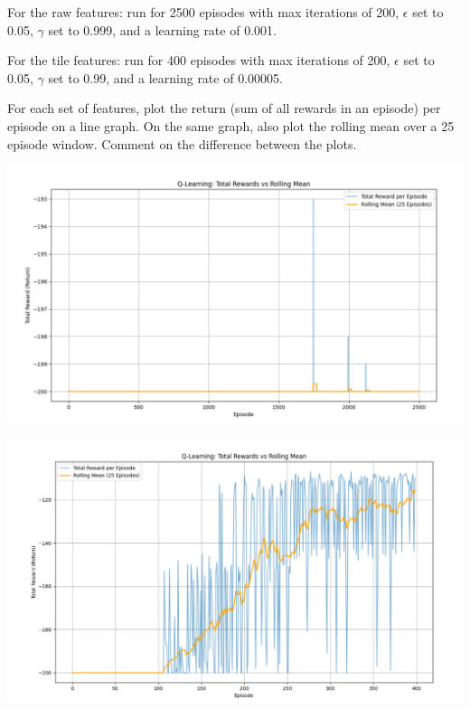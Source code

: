 \documentclass[11pt,addpoints,answers]{exam}
\begin{document}
\begin{questions}
\begin{parts}
    For the raw features: run for 2500 episodes with max iterations of 200, $\epsilon$ set to 0.05, $\gamma$ set to 0.999, and a learning rate of 0.001. 
    
    For the tile features: run for 400 episodes with max iterations of 200, $\epsilon$ set to 0.05, $\gamma$ set to 0.99, and a learning rate of 0.00005.
    
    For each set of features, plot the return (sum of all rewards in an episode) per episode on a line graph. On the same graph, also plot the rolling mean over a 25 episode window. Comment on the difference between the plots.
    
    \begin{your_solution}[title=Plot of Raw, height=10cm]
        \begin{center}
           \includegraphics[width=1\linewidth, height=0.6\columnwidth]{./Q5_1_mc_raw.png}
        \end{center}
    \end{your_solution}
    
    \begin{your_solution}[title=Plot of Tile, height=10cm]
        \begin{center}
			\includegraphics[width=1\linewidth, height=0.6\columnwidth]{./Q5_1_mc_tile.png}
		\end{center}
    \end{your_solution}
    

\end{parts}
\end{questions}
\end{document}
